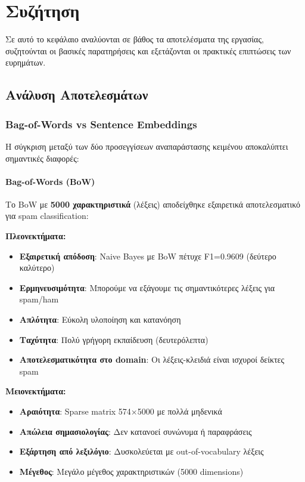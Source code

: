 \documentclass[12pt,a4paper,twoside]{book}
\begin{document}
\chapter{Συζήτηση}

Σε αυτό το κεφάλαιο αναλύονται σε βάθος τα αποτελέσματα της εργασίας, συζητούνται οι βασικές παρατηρήσεις και εξετάζονται οι πρακτικές επιπτώσεις των ευρημάτων.

\section{Ανάλυση Αποτελεσμάτων}

\subsection{Bag-of-Words vs Sentence Embeddings}

Η σύγκριση μεταξύ των δύο προσεγγίσεων αναπαράστασης κειμένου αποκαλύπτει σημαντικές διαφορές:

\subsubsection{Bag-of-Words (BoW)}

Το BoW με \textbf{5000 χαρακτηριστικά} (λέξεις) αποδείχθηκε εξαιρετικά αποτελεσματικό για spam classification:

\textbf{Πλεονεκτήματα:}
\begin{itemize}
    \item \textbf{Εξαιρετική απόδοση}: Naive Bayes με BoW πέτυχε F1=0.9609 (δεύτερο καλύτερο)
    \item \textbf{Ερμηνευσιμότητα}: Μπορούμε να εξάγουμε τις σημαντικότερες λέξεις για spam/ham
    \item \textbf{Απλότητα}: Εύκολη υλοποίηση και κατανόηση
    \item \textbf{Ταχύτητα}: Πολύ γρήγορη εκπαίδευση (δευτερόλεπτα)
    \item \textbf{Αποτελεσματικότητα στο domain}: Οι λέξεις-κλειδιά είναι ισχυροί δείκτες spam
\end{itemize}

\textbf{Μειονεκτήματα:}
\begin{itemize}
    \item \textbf{Αραιότητα}: Sparse matrix 574×5000 με πολλά μηδενικά
    \item \textbf{Απώλεια σημασιολογίας}: Δεν κατανοεί συνώνυμα ή παραφράσεις
    \item \textbf{Εξάρτηση από λεξιλόγιο}: Δυσκολεύεται με out-of-vocabulary λέξεις
    \item \textbf{Μέγεθος}: Μεγάλο μέγεθος χαρακτηριστικών (5000 dimensions)
\end{itemize}
\end{document}
